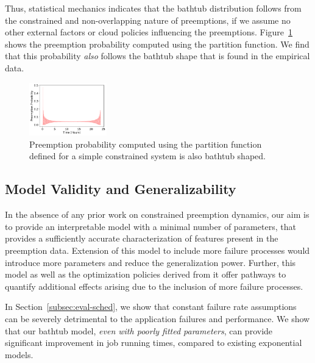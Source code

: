 \documentclass[compsoc]{IEEEtran}
\begin{document}
Thus, statistical mechanics indicates that the bathtub distribution follows from the constrained and non-overlapping nature of preemptions, if we assume no other external factors or cloud policies influencing the preemptions. 
Figure~\ref{fig:partfun} shows the preemption probability computed using the partition function.
We find that this probability \emph{also} follows the bathtub shape that is found in the empirical data. 




\begin{figure}[t]
  \centering
  \includegraphics[width=0.3\textwidth]{analytical_prob.pdf}
  \caption{Preemption probability computed using the partition function defined for a simple constrained system is also bathtub shaped.}
  \label{fig:partfun}
\end{figure}



\subsection{Model Validity and Generalizability}

In the absence of any prior work on constrained preemption dynamics, our aim is to provide an interpretable model with a minimal number of parameters, that provides a sufficiently accurate characterization of features present in the preemption data. 
Extension of this model to include more failure processes would introduce more parameters and reduce the generalization power. Further, this model as well as the optimization policies derived from it offer pathways to quantify additional effects arising due to the inclusion of more failure processes.  

In Section~\ref{subsec:eval-sched}, we  show that constant failure rate assumptions can be severely detrimental to the application failures and performance. 
We show that our bathtub model, \emph{even with poorly fitted parameters}, can provide significant improvement in job running times, compared to existing exponential models.



 
\end{document}
